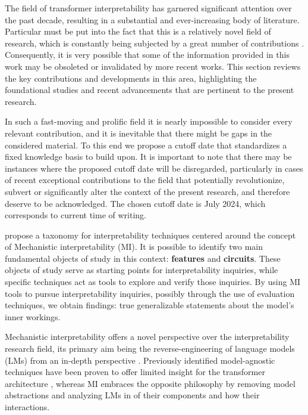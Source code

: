 The field of transformer interpretability has garnered significant attention over the past decade, resulting in a substantial and ever-increasing body of literature.
Particular  must be put into the fact that this is a relatively novel field of research, which is constantly being subjected by a great number of contributions .
Consequently, it is very possible that some of the information provided in this work may be obsoleted or invalidated by more recent works.
This section reviews the key contributions and developments in this area, highlighting the foundational studies and recent advancements that are pertinent to the present research.

In such a fast-moving and prolific field it is nearly impossible to consider every relevant contribution, and it is inevitable that there might be gaps in the considered material.
To this end we propose a cutoff date that standardizes a fixed knowledge basis to build upon.
It is important to note that there may be instances where the proposed cutoff date will be disregarded, particularly in cases of recent exceptional contributions to the field that potentially revolutionize, subvert or significantly alter the context of the present research, and therefore deserve to be acknowledged.
The chosen cutoff date is July 2024, which corresponds to current time of writing.

\citet{rai2024} propose a taxonomy for interpretability techniques centered around the concept of Mechanistic interpretability (MI).
It is possible to identify two main fundamental objects of study in this context: \textbf{features} and \textbf{circuits}.
These objects of study serve as starting points for interpretability inquiries, while specific techniques act as tools to explore and verify those inquiries.
By using MI tools to pursue interpretability inquiries, possibly through the use of evaluation techniques, we obtain findings: true generalizable statements about the model's inner workings.

Mechanistic interpretability offers a novel perspective over the interpretability research field, its primary aim being the reverse-engineering of language models (LMs) from an in-depth perspective \cite{olah2022}.
Previously identified model-agnostic techniques have been proven to offer limited insight for the transformer architecture , whereas MI embraces the opposite philosophy by removing model abstractions and analyzing LMs in  of their components and how their interactions.


